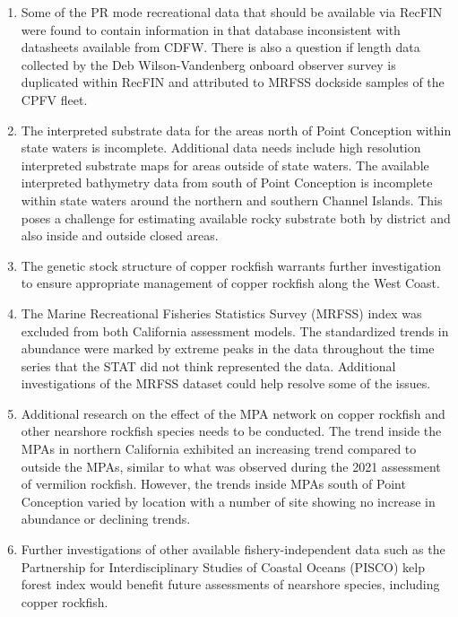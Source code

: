 \documentclass[11pt,
  english,
  letterpaper,
]{article}
\begin{document}
\begin{enumerate}
    \item Some of the PR mode recreational data that should be available via RecFIN were found to contain information in that database inconsistent with datasheets available from CDFW. There is also a question if length data collected by the Deb Wilson-Vandenberg onboard observer survey is duplicated within RecFIN and attributed to MRFSS dockside samples of the CPFV fleet.

    \item The interpreted substrate data for the areas north of Point Conception within state waters is incomplete. Additional data needs include high resolution interpreted substrate maps for areas outside of state waters. The available interpreted bathymetry data from south of Point Conception is incomplete within state waters  around the northern and southern Channel Islands. This poses a challenge for estimating available rocky substrate both by district and also inside and outside closed areas. 

    \item The genetic stock structure of copper rockfish warrants further investigation to ensure appropriate management of copper rockfish along the West Coast. 

    \item The Marine Recreational Fisheries Statistics Survey (MRFSS) index was excluded from both California assessment models. The standardized trends in abundance were marked by extreme peaks in the data throughout the time series that the STAT did not think represented the data. Additional investigations of the MRFSS dataset could help resolve some of the issues.

 \item Additional research on the effect of the MPA network on copper rockfish and other nearshore rockfish species needs to be conducted. The trend inside the MPAs in northern California exhibited an increasing trend compared to outside the MPAs, similar to what was observed during the 2021 assessment of vermilion rockfish. However, the trends inside MPAs south of Point Conception varied by location with a number of site showing no increase in abundance or declining trends.  

 \item Further investigations of other available fishery-independent data such as the Partnership for Interdisciplinary Studies of Coastal Oceans (PISCO) kelp forest index would benefit future assessments of nearshore species, including copper rockfish. 


\end{enumerate}
\end{document}
